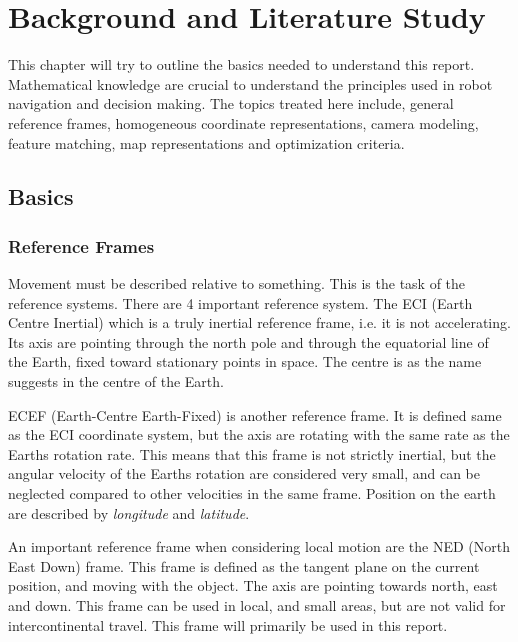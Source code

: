 


\chapter{Background and Literature Study}
\label{chap2}
This chapter will try to outline the basics needed to understand this report. Mathematical
knowledge are crucial to understand the principles used in robot navigation and decision
making. The topics treated here include, general reference frames, homogeneous coordinate
representations, camera modeling, feature matching, map representations and optimization
criteria.



\section{Basics}

\subsection{Reference Frames}
	Movement must be described relative to something. This is the task of the reference systems. There are
	4 important reference system. The ECI (Earth Centre Inertial) which is a truly inertial reference
	frame, i.e. it is not accelerating. Its axis are pointing through the north pole and through the
	equatorial line of the Earth, fixed toward stationary points in space. The centre is as the name
	suggests in the centre of the Earth. 
	
	ECEF (Earth-Centre Earth-Fixed) is another reference frame. It is defined same as the ECI coordinate
	system, but the axis are rotating with the same rate as the Earths rotation rate. This means that this frame
	is not
	strictly inertial, but the angular velocity of the Earths rotation are considered very small, and can
	be neglected compared to other velocities in the same frame. Position on the earth are described by
	\emph{longitude} and \emph{latitude}.

	An important reference frame when considering local motion are the NED (North East Down) frame. This
	frame is defined as the tangent plane on the current position, and moving with the object. The axis
	are pointing towards north, east and down. This frame can be used in local, and small areas, but are
	not valid for intercontinental travel. This frame will primarily be used in this report. 

